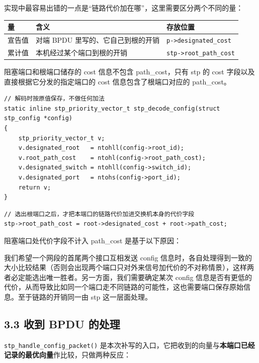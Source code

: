 \documentclass[UTF8,12pt,a4paper,fontset=fandol]{ctexart}
\begin{document}
实现中最容易出错的一点是“链路代价加在哪”，这里需要区分两个不同的量：

{\small\setlength{\parindent}{0pt}
\begin{tabular}{@{}L{0.12\textwidth}L{0.50\textwidth}L{0.30\textwidth}@{}}
\toprule
{}\textbf{量} & \textbf{含义} & \textbf{存放位置}\\
\midrule
宣告值 & 对端 BPDU 里写的、它自己到根的开销 & \texttt{p->designated\_cost}\\
累计值 & 本机经过某个端口到根的开销 & \texttt{stp->root\_path\_cost}\\
\bottomrule
\end{tabular}}

阻塞端口和根端口储存的 cost 信息不包含 path\_cost，只有 stp 的 cost 字段以及直接根据它分发的指定端口的 cost 信息包含了根端口对应的 path\_cost。

\begin{verbatim}
// 解码时按原值保存，不做任何加法
static inline stp_priority_vector_t stp_decode_config(struct stp_config *config)
{
    stp_priority_vector_t v;
    v.designated_root   = ntohll(config->root_id);
    v.root_path_cost    = ntohl(config->root_path_cost);
    v.designated_switch = ntohll(config->switch_id);
    v.designated_port   = ntohs(config->port_id);
    return v;
}
\end{verbatim}

\begin{verbatim}
// 选出根端口之后，才把本端口的链路代价加进交换机本身的代价字段
stp->root_path_cost = root->designated_cost + root->path_cost;
\end{verbatim}

阻塞端口处代价字段不计入 path\_cost 是基于以下原因：

我们希望一个网段的首尾两个接口互相发送 config 信息时，各自处理得到一致的大小比较结果（否则会出现两个端口只对外来信号加代价的不对称情景），这样两者必定能选出唯一胜者。另一方面，我们需要确定某次 config 信息是否有更低的代价，从而导致比如同一个端口走不同链路的可能性，这也需要端口保存原始信息。至于链路的开销同一由 stp 这一层面处理。

\subsection*{3.3 收到 BPDU 的处理}

\texttt{stp\_handle\_config\_packet()} 是本次补写的入口，它把收到的向量与\textbf{本端口已经记录的最优向量}作比较，只做两种反应：
\end{document}
